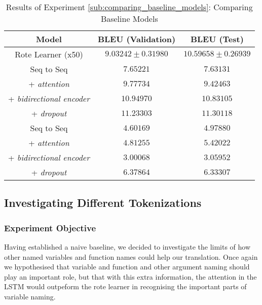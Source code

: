 \begin{table}[h!]
\begin{center}
\begin{tabular}{ c | c | c }
    Model                             & BLEU (Validation)  & BLEU (Test)    \\
    \hline
    Rote Learner (x50)                & $ 9.03242 \pm  0.31980 $ & $ 10.59658 \pm 0.26939 $   \\
    \hline
    Seq to Seq                        & $ 7.65221 $  & $ 7.63131  $ \\
    + \textit{attention}              & $ 9.77734 $  & $ 9.42463  $ \\
    + \textit{bidirectional encoder}  & $ 10.94970 $ & $ 10.83105 $ \\
    + \textit{dropout}                & $ 11.23303 $ & $ 11.30118 $ \\
    \hline
    Seq to Seq                        & $ 4.60169 $ & $ 4.97880 $  \\
    + \textit{attention}              & $ 4.81255 $ & $ 5.42022 $  \\
    + \textit{bidirectional encoder}  & $ 3.00068 $ & $ 3.05952 $  \\
    + \textit{dropout}                & $ 6.37864 $ & $ 6.33307 $  \\
    \hline
\end{tabular}
\caption {Results of Experiment \ref{sub:comparing_baseline_models}: Comparing Baseline Models }
\label{table:name_baseline}
\end{center}
\end{table}



\subsection{Investigating Different Tokenizations} %
\label{sub:investigating_different_tokenizations}

\subsubsection{Experiment Objective} %

Having established a naive baseline, we decided to investigate the limits of how other named variables and function names could help our translation.
Once again we hypothesised that variable and function and other argument naming should play an important role, but that with this extra information, the attention in the LSTM would outpeform the rote learner in recognising the important parts of variable naming.

